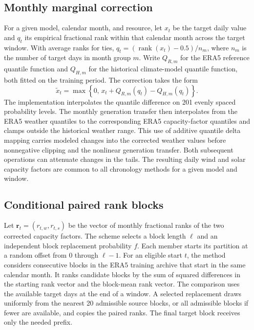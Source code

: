 \subsection{Monthly marginal correction}
For a given model, calendar month, and resource, let $x_t$ be the target daily value and $q_t$ its empirical fractional rank within that calendar month across the target window. With average ranks for ties, $q_t=(\operatorname{rank}(x_t)-0.5)/n_m$, where $n_m$ is the number of target days in month group $m$. Write $Q_{R,m}$ for the ERA5 reference quantile function and $Q_{H,m}$ for the historical climate-model quantile function, both fitted on the training period. The correction takes the form
\begin{equation}
\label{eq:qdm}
\widetilde{x}_t = \max\!\left\{0,\,
  x_t+Q_{R,m}(q_t)-Q_{H,m}(q_t)\right\}.
\end{equation}
The implementation interpolates the quantile difference on 201 evenly spaced probability levels. The monthly generation transfer then interpolates from the ERA5 weather quantiles to the corresponding ERA5 capacity-factor quantiles and clamps outside the historical weather range. This use of additive quantile delta mapping carries modeled changes into the corrected weather values before nonnegative clipping and the nonlinear generation transfer. Both subsequent operations can attenuate changes in the tails. The resulting daily wind and solar capacity factors are common to all chronology methods for a given model and window.

\subsection{Conditional paired rank blocks}
Let $\mathbf{r}_t=(r_{t,w},r_{t,s})$ be the vector of monthly fractional ranks of the two corrected capacity factors. The scheme selects a block length $\ell$ and an independent block replacement probability $f$. Each member starts its partition at a random offset from $0$ through $\ell-1$. For an eligible start $t$, the method considers consecutive blocks in the ERA5 training archive that start in the same calendar month. It ranks candidate blocks by the sum of squared differences in the starting rank vector and the block-mean rank vector. The comparison uses the available target days at the end of a window. A selected replacement draws uniformly from the nearest 20 admissible source blocks, or all admissible blocks if fewer are available, and copies the paired ranks. The final target block receives only the needed prefix.

